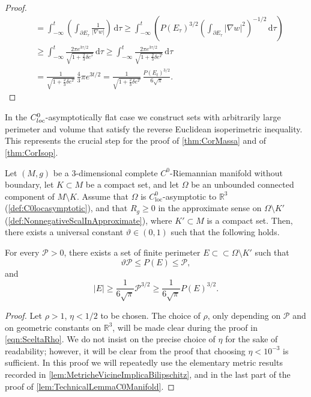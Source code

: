 \documentclass[a4paper,12pt,reqno]{amsart}
\numberwithin{equation}{section}
\theoremstyle{plain}
\theoremstyle{definition}
\theoremstyle{remark}
\newcommand{\de}{\ensuremath{\,\mathrm d}} %
\begin{document}
{\begin{proof}
\begin{equation}
\begin{split}
        &=\int_{-\infty}^t \left(\int_{\partial E_\tau} \frac{1}{|\nabla w|}\right)\de\tau \geq \int_{-\infty}^t \left(P( E_\tau)^{3/2}\left(\int_{\partial E_\tau}|\nabla w|^2\right)^{-1/2} \de \tau \right)\\
        &\geq \int_{-\infty}^t \frac{2\pi e^{3\tau/2}}{\sqrt{1+\frac{2}{3}\delta e^\tau}} \de \tau  \geq \int_{-\infty}^t \frac{2\pi e^{3\tau/2}}{\sqrt{1+\frac{2}{3}\delta e^T}} \de \tau \\
        &=
        \frac{1}{\sqrt{1+\frac{2}{3}\delta e^T}} \, \frac{4}{3}\pi e^{3t/2}=\frac{1}{\sqrt{1+\frac{2}{3}\delta e^T}}\, \frac{P(E_t)^{3/2}}{6\sqrt{\pi}}.
      \end{split}  
    \end{equation}
\end{proof}


In the $C^0_{\rm loc}$-asymptotically flat case we construct sets with arbitrarily large perimeter and volume that satisfy the reverse Euclidean isoperimetric inequality. This represents the crucial step for the proof of \cref{thm:CorMassa} and of \cref{thm:CorIsop}.
 
\begin{proposition}\label{prop:GrossiQuantoVoglio}
    Let $(M,g)$ be a $3$-dimensional complete $C^0$-Riemannian manifold without boundary, let $K\subset M$ be a compact set, and let $\Omega$ be an unbounded connected component of $M\setminus K$. Assume that $\Omega$ is $C^0_{\mathrm{loc}}$-asymptotic to $\mathbb R^3$ (\cref{def:C0locasymptotic}), and that $R_g\geq 0$ in the approximate sense on $\Omega\setminus K'$ (\cref{def:NonnegativeScalInApproximate}), where $K'\subset M$ is a compact set. Then, there exists a universal constant $\vartheta\in(0,1)$ such that the following holds.
    
    For every $\mathscr{P}>0$, there exists a set of finite perimeter $E\subset\subset \Omega\setminus K'$ such that
    \[
    \vartheta \mathscr{P}\leq P(E)\leq \mathscr{P},
    \]
    and
    \begin{equation}\label{eqn:IlControlloAlContrario}
    |E|\geq \frac{1}{6\sqrt{\pi}}\mathscr{P}^{3/2}\geq \frac{1}{6\sqrt{\pi}}P(E)^{3/2}.
    \end{equation}
\end{proposition}

\begin{proof}
Let $\rho>1$, $\eta<1/2$ to be chosen. The choice of $\rho$, only depending on $\mathscr{P}$ and on geometric constants on $\mathbb R^3$, will be made clear during the proof in \eqref{eqn:SceltaRho}. We do not insist on the precise choice of $\eta$ for the sake of readability; however, it will be clear from the proof that choosing $\eta<10^{-3}$ is sufficient. In this proof we will repeatedly use the elementary metric results recorded in \cref{lem:MetricheVicineImplicaBilipschitz}, and in the last part of the proof of \cref{lem:TechnicalLemmaC0Manifold}.


\end{proof}}
\end{document}
